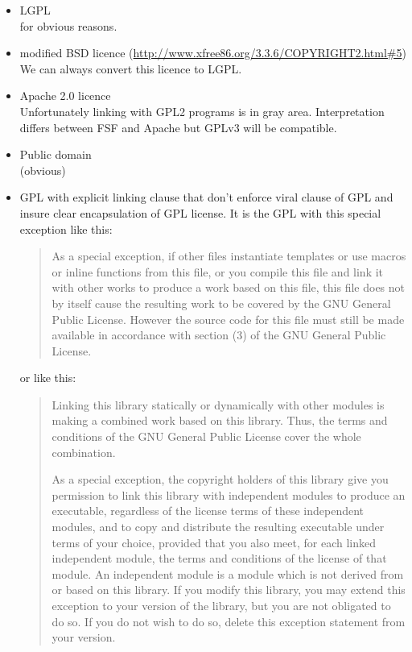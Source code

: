 \begin{itemize}
\item LGPL\\
  for obvious reasons.
\item  modified BSD licence
  (\url{http://www.xfree86.org/3.3.6/COPYRIGHT2.html#5})\\
  We can always convert this licence to LGPL.
\item  Apache 2.0 licence \\
  Unfortunately linking with GPL2 programs is in gray area.
  Interpretation differs between FSF and Apache but GPLv3 will be
  compatible.
\item Public domain\\
  (obvious)
\item GPL with explicit linking clause that don't enforce
  viral clause of GPL and insure clear encapsulation of GPL license.
  It is the GPL with this special exception like this:

  \begin{quote}
    As a special exception, if other files instantiate templates or
    use macros or inline functions from this file, or you compile this
    file and link it with other works to produce a work based on this
    file, this file does not by itself cause the resulting work to be
    covered by the GNU General Public License.  However the source
    code for this file must still be made available in accordance with
    section (3) of the GNU General Public License.
  \end{quote}
	   
  or like this:
	   
  \begin{quote}
    Linking this library statically or dynamically with other modules
    is making a combined work based on this library. Thus, the terms
    and conditions of the GNU General Public License cover the whole
    combination.
  
    As a special exception, the copyright holders of this library give
    you permission to link this library with independent modules to
    produce an executable, regardless of the license terms of these
    independent modules, and to copy and distribute the resulting
    executable under terms of your choice, provided that you also
    meet, for each linked independent module, the terms and conditions
    of the license of that module. An independent module is a module
    which is not derived from or based on this library. If you modify
    this library, you may extend this exception to your version of the
    library, but you are not obligated to do so.  If you do not wish
    to do so, delete this exception statement from your version.
  \end{quote}

\end{itemize}

